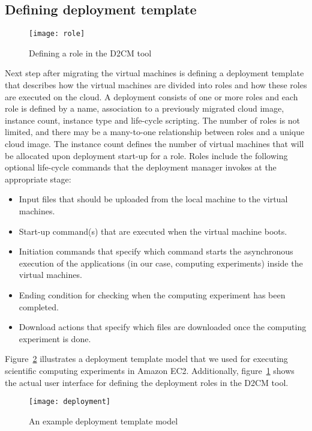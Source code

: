 \documentclass[a4paper,10pt]{article}
\begin{document}
\subsection{Defining deployment template}
\label{deploymenttemplate}

\begin{figure}
\centering
\texttt{[image: role]}
\caption{Defining a role in the D2CM tool}
\label{fig:role}
\end{figure}

Next step after migrating the virtual machines is defining a deployment template that describes how the virtual machines are divided into roles and how these roles are executed on the cloud. A deployment consists of one or more roles and each role is defined by a name, association to a previously migrated cloud image, instance count, instance type and life-cycle scripting. The number of roles is not limited, and there may be a many-to-one relationship between roles and a unique cloud image. The instance count defines the number of virtual machines that will be allocated upon deployment start-up for a role. Roles include the following optional life-cycle commands that the deployment manager invokes at the appropriate stage:

\begin{itemize}
\item{Input files that should be uploaded from the local machine to the virtual machines.}
\item{Start-up command(s) that are executed when the virtual machine boots.}
\item{Initiation commands that specify which command starts the asynchronous execution of the applications (in our case, computing experiments) inside the virtual machines.}
\item{Ending condition for checking when the computing experiment has been completed.}
\item{Download actions that specify which files are downloaded once the computing experiment is done.}
\end{itemize}

Figure~\ref{fig:deploymentTemplate} illustrates a deployment template model that we used for executing scientific computing experiments in Amazon EC2. Additionally, figure~\ref{fig:role} shows the actual user interface for defining the deployment roles in the D2CM tool. 

\begin{figure}
\centering
\texttt{[image: deployment]}
\caption{An example deployment template model}
\label{fig:deploymentTemplate}
\end{figure}
\end{document}
